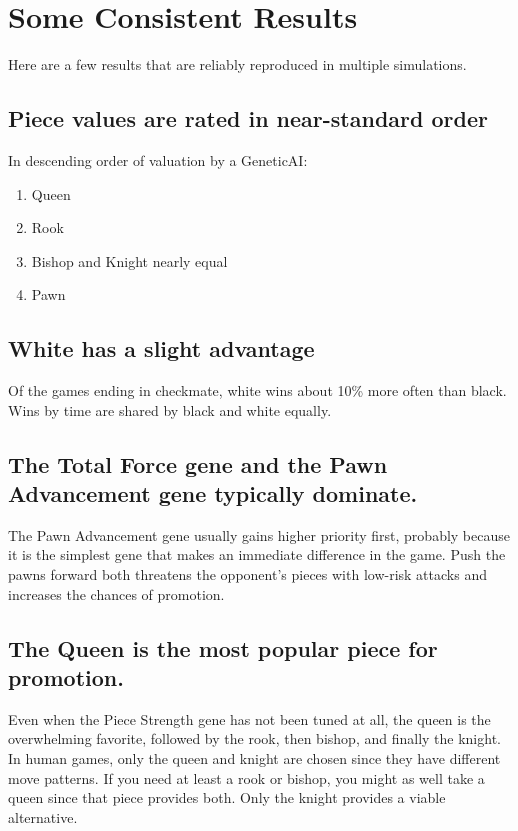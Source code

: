 \documentclass[letter]{article}
\renewcommand\_{\textunderscore\allowbreak}
\begin{document}
\section{Some Consistent Results}

Here are a few results that are reliably reproduced in multiple simulations.

\subsection*{Piece values are rated in near-standard order}
In descending order of valuation by a Genetic\_AI:
\begin{enumerate}
	\item Queen
	\item Rook
	\item Bishop and Knight nearly equal
	\item Pawn
\end{enumerate}

\subsection*{White has a slight advantage}

Of the games ending in checkmate, white wins about 10\% more often than black. Wins by time are shared by black and white equally.

\subsection*{The Total Force gene and the Pawn Advancement gene typically dominate.}

The Pawn Advancement gene usually gains higher priority first, probably because it is the simplest gene that makes an immediate difference in the game. Push the pawns forward both threatens the opponent's pieces with low-risk attacks and increases the chances of promotion.

\subsection*{The Queen is the most popular piece for promotion.}

Even when the Piece Strength gene has not been tuned at all, the queen is the overwhelming favorite, followed by the rook, then bishop, and finally the knight. In human games, only the queen and knight are chosen since they have different move patterns. If you need at least a rook or bishop, you might as well take a queen since that piece provides both. Only the knight provides a viable alternative. 
\end{document}
